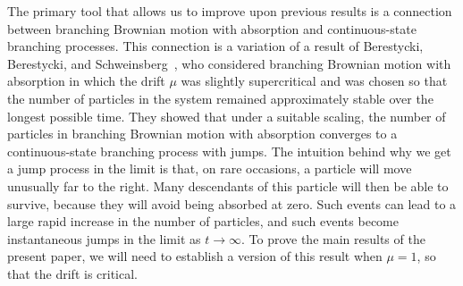 \documentclass[AHL,Unicode,longabstracts,published]{cedram}
\newcommand{\1} {\mathds{1}}
\begin{document}
The primary tool that allows us to improve upon previous results is a connection between branching Brownian motion with absorption and continuous-state branching processes. This connection is a variation of a result of Berestycki, Berestycki, and Schweinsberg~\cite{bbs2}, who considered branching Brownian motion with absorption in which the drift $\mu$ was slightly supercritical and was chosen so that the number of particles in the system remained approximately stable over the longest possible time. They showed that under a suitable scaling, the number of particles in branching Brownian motion with absorption converges to a continuous-state branching process with jumps. The intuition behind why we get a jump process in the limit is that, on rare occasions, a particle will move unusually far to the right. Many descendants of this particle will then be able to survive, because they will avoid being absorbed at zero. Such events can lead to a large rapid increase in the number of particles, and such events become instantaneous jumps in the limit as $t \rightarrow \infty$. To prove the main results of the present paper, we will need to establish a version of this result when $\mu = 1$, so that the drift is critical.
\end{document}
